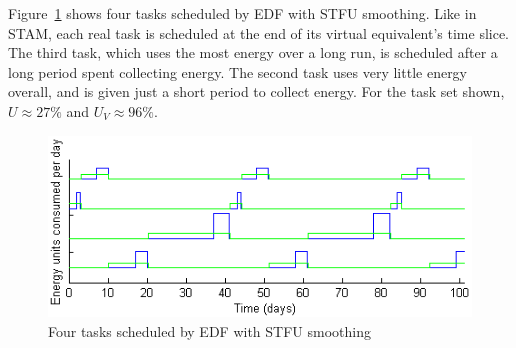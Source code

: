 Figure~\ref{fig:stfutaskplot} shows four tasks scheduled by EDF with \textsc{STFU} smoothing.  Like in STAM, each real task is scheduled at the end of its virtual equivalent's time slice.  The third task, which uses the most energy over a long run, is scheduled after a long period spent collecting energy.  The second task uses very little energy overall, and is given just a short period to collect energy.  For the task set shown, $U \approx 27\%$ and $U_V \approx 96\%$.

\begin{figure}[htb]
\includegraphics[scale=0.72]{stfutasks.png}
\caption{Four tasks scheduled by EDF with \textsc{STFU} smoothing}
\label{fig:stfutaskplot}
\end{figure}



































